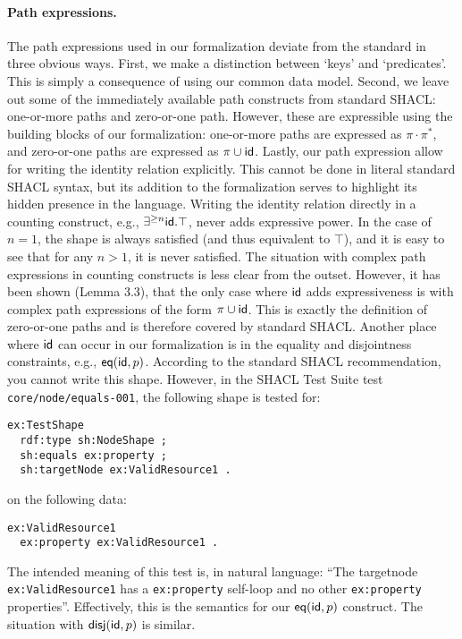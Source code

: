 \paragraph{Path expressions.} The path expressions used in our formalization deviate from the standard in three obvious ways. First, we make a distinction between `keys' and `predicates'. This is simply a consequence of using our common data model. Second, we leave out some of the immediately available path constructs from standard SHACL: one-or-more paths and zero-or-one path. However, these are expressible using the building blocks of our formalization: one-or-more paths are expressed as $\pi\cdot\pi^{*}$, and zero-or-one paths are expressed as $\pi\cup\mathsf{id}$. Lastly, our path expression allow for writing the identity relation explicitly. This cannot be done in literal standard SHACL syntax, but its addition to the formalization serves to highlight its hidden presence in the language. Writing the identity relation directly in a counting construct, e.g., $\exists^{\geq n}\mathsf{id}.\top$, never adds expressive power. In the case of $n=1$, the shape is always satisfied (and thus equivalent to $\top$), and it is easy to see that for any $n > 1$, it is never satisfied. The situation with complex path expressions in counting constructs is less clear from the outset. However, it has been shown \cite{BJVdB24} (Lemma 3.3), that the only case where $\mathsf{id}$ adds expressiveness is with complex path expressions of the form $\pi\cup\mathsf{id}$. This is exactly the definition of zero-or-one paths and is therefore covered by standard SHACL. Another place where $\mathsf{id}$ can occur in our formalization is in the equality and disjointness constraints, e.g., $\mathsf{eq}(\mathsf{id},p)$. According to the standard SHACL recommendation, you cannot write this shape. However, in the SHACL Test Suite \cite{LKK24} test \texttt{core/node/equals-001}, the following shape is tested for:
\begin{verbatim}
ex:TestShape
  rdf:type sh:NodeShape ;
  sh:equals ex:property ;
  sh:targetNode ex:ValidResource1 .
\end{verbatim}
on the following data:
\begin{verbatim}
ex:ValidResource1
  ex:property ex:ValidResource1 .
\end{verbatim}
The intended meaning of this test is, in natural language: ``The targetnode \texttt{ex:ValidResource1} has a \texttt{ex:property} self-loop and no other \texttt{ex:property} properties''. Effectively, this is the semantics for our $\mathsf{eq}(\mathsf{id},p)$ construct. The situation with $\mathsf{disj}(\mathsf{id},p)$ is similar.

